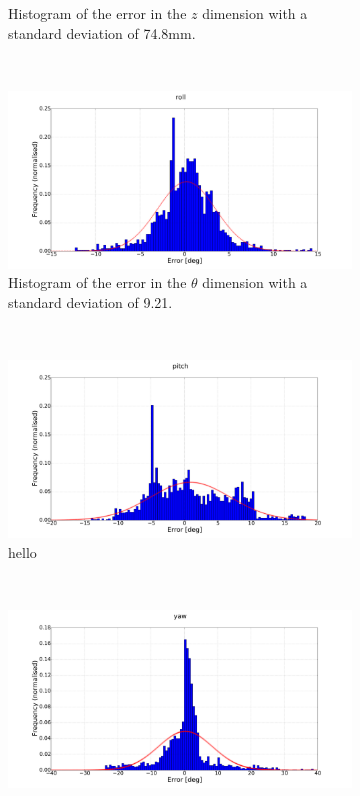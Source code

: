 \begin{figure}
\begin{subfigure}{0.45\textwidth}
     \caption{Histogram of the error in the $z$ dimension with a standard deviation of 74.8mm.}
  \label{fig:norm-z}
  \end{subfigure}
~
  \begin{subfigure}{0.45\textwidth}
     \includegraphics[clip, trim = 150 50 175 0, width=\textwidth]{figures/chapter3/norm_roll}
     \caption{Histogram of the error in the $\theta$ dimension with a standard deviation of 9.21\degree.}
  \label{fig:norm-roll}
  \end{subfigure}
~
  \begin{subfigure}{0.45\textwidth}
     \includegraphics[clip, trim = 150 50 175 0, width=\textwidth]{figures/chapter3/norm_pitch}
     \caption{hello}
  \label{fig:norm-pitch}
  \end{subfigure}
~
  \begin{subfigure}{0.45\textwidth}
     \includegraphics[clip, trim = 150 50 175 0, width=\textwidth]{figures/chapter3/norm_yaw}

\end{subfigure}
\end{figure}
